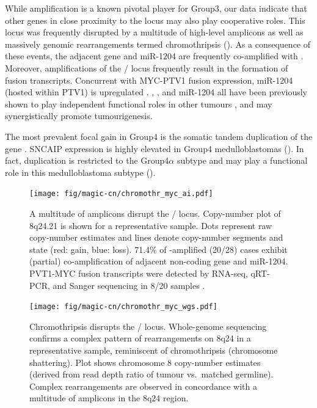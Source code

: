 While  amplification is a known pivotal player for Group3, our data indicate that other genes in close proximity to the  locus may also play cooperative roles. This locus was frequently disrupted by a multitude of high-level amplicons  as well as massively genomic rearrangements termed chromothripsis (). As a consequence of these events, the adjacent  gene and miR-1204 are frequently co-amplified with . Moreover, amplifications of the / locus frequently result in the formation of fusion transcripts. Concurrent with MYC-PTV1 fusion expression, miR-1204 (hosted within PTV1) is upregulated . , , and miR-1204 all have been previously shown to play independent functional roles in other tumours , and may synergistically promote tumourigenesis.

The most prevalent focal gain in Group4 is the somatic tandem duplication of the  gene . SNCAIP expression is highly elevated in Group4 medulloblastomas (). In fact,  duplication is restricted to the Group4$\alpha$ subtype and may play a functional role in this medulloblastoma subtype ().

\begin{figure}[t]
	\begin{center}
		\texttt{[image: fig/magic-cn/chromothr\_myc\_ai.pdf]}
	\end{center}
	\caption[A multitude of amplicons disrupt the / locus]
	{
	A multitude of amplicons disrupt the / locus.
	Copy-number plot of 8q24.21 is shown for a representative sample. Dots represent raw copy-number estimates and lines denote copy-number segments and state (red: gain, blue: loss). 71.4\% of -amplified (20/28) cases exhibit (partial) co-amplification of adjacent non-coding  gene and miR-1204. PVT1-MYC fusion transcripts were detected by RNA-seq, qRT-PCR, and Sanger sequencing in 8/20 samples .
	}
	\label{fig:chromothr_myc}
\end{figure}


\begin{figure}[b]
	\begin{center}
		\texttt{[image: fig/magic-cn/chromothr\_myc\_wgs.pdf]}
	\end{center}
	\caption[Chromothripsis disrupts the / locus.]
	{
		Chromothripsis disrupts the / locus.
		Whole-genome sequencing confirms a complex pattern of rearrangements on 8q24 in a representative sample, reminiscent of chromothripsis (chromosome shattering).
		Plot shows chromosome 8 copy-number estimates (derived from read depth ratio of tumour vs.\ matched germline).
		Complex rearrangements are observed in concordance with a multitude of amplicons in the 8q24 region.
	}
	\label{fig:chromothr_myc_wgs}
\end{figure}

